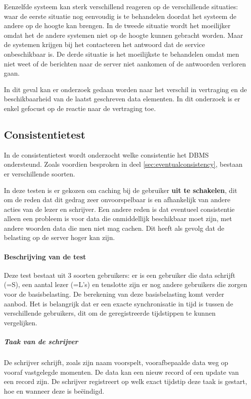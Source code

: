 Eenzelfde systeem kan sterk verschillend reageren op de verschillende situaties: waar de eerste situatie nog eenvoudig is te behandelen doordat het systeem de andere op de hoogte kan brengen. In de tweede situatie wordt het moeilijker omdat het de andere systemen niet op de hoogte kunnen gebracht worden. Maar de systemen krijgen bij het contacteren het antwoord dat de service onbeschikbaar is. De derde situatie is het moeilijkste te behandelen omdat men niet weet of de berichten naar de server niet aankomen of de antwoorden verloren gaan. 

In dit geval kan er onderzoek gedaan worden naar het verschil in vertraging en de beschikbaarheid van de laatst geschreven data elementen. In dit onderzoek is er enkel gefocust op de reactie naar de vertraging toe. 
 
\subsection{Consistentietest}
In de consistentietest wordt onderzocht welke consistentie het DBMS ondersteund. Zoals voordien besproken in deel \ref{sec:eventualconsistency}, bestaan er verschillende soorten. 

In deze testen is er gekozen om caching bij de gebruiker \textbf{uit te schakelen}, dit om de reden dat dit gedrag zeer onvoorspelbaar is en afhankelijk van andere acties van de lezer en schrijver. Een andere reden is dat eventueel consistentie alleen een probleem is voor data die onmiddellijk beschikbaar moet zijn, met andere woorden data die men niet mag cachen. Dit heeft als gevolg dat de belasting op de server hoger kan zijn. 

\paragraph{Beschrijving van de test} Deze test bestaat uit 3 soorten gebruikers: er is een gebruiker die data schrijft (=S), een aantal lezer (=L's) en tenslotte zijn er nog andere gebruikers die zorgen voor de basisbelasting. De berekening van deze basisbelasting komt verder aanbod.  
Het is belangrijk dat er een exacte synchronisatie in tijd is tussen de verschillende gebruikers, dit om de geregistreerde tijdstippen te kunnen vergelijken.


\subparagraph{Taak van de schrijver} De schrijver schrijft, zoals zijn naam voorspelt, voorafbepaalde data weg op vooraf vastgelegde momenten. De data kan een nieuw record of een update van een record zijn. De schrijver registreert op welk exact tijdstip deze taak is gestart, hoe en wanneer deze is beëindigd.


